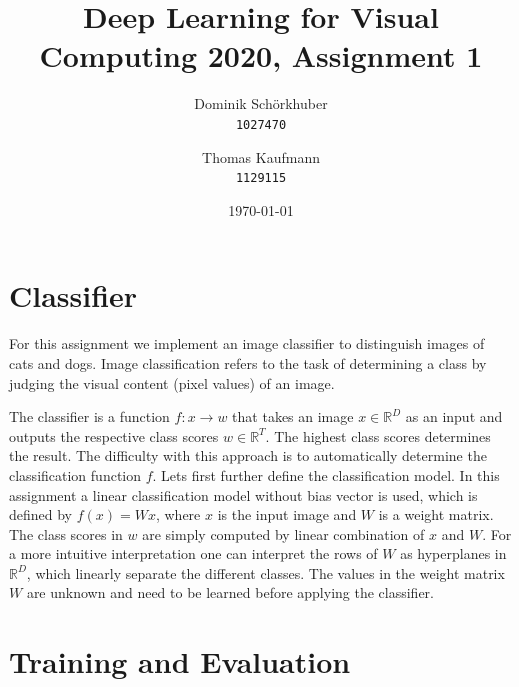 \documentclass[12pt]{article}
\title{\Large\vspace{-4cm}Deep Learning for Visual Computing 2020, Assignment 1}
\author{
  Dominik Schörkhuber\\
  \texttt{1027470}
  \and
  Thomas Kaufmann\\
  \texttt{1129115}
}
\date{\today}
\begin{document}
	\maketitle

\section{Classifier}
For this assignment we implement an image classifier to distinguish images of cats and dogs. Image classification refers to the task of determining a class by judging the visual content (pixel values) of an image.

The classifier is a function $f\colon x \to w$ that takes an image $x \in \mathbb{R}^D$ as an input and outputs the respective class scores $w \in \mathbb{R}^T$. The highest class scores determines the result. The difficulty with this approach is to automatically determine the classification function $f$. Lets first further define the classification model. In this assignment a linear classification model without bias vector is used, which is defined by $f(x) = Wx$, where $x$ is the input image and $W$ is a weight matrix. The class scores in $w$ are simply computed by linear combination of $x$ and $W$. For a more intuitive interpretation one can interpret the rows of $W$ as hyperplanes in $\mathbb{R}^D$, which linearly separate the different classes. The values in the weight matrix $W$ are unknown and need to be learned before applying the classifier. 

\section{Training and Evaluation}



\end{document}
